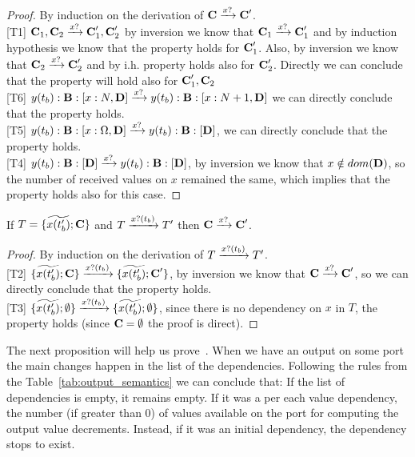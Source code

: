 \begin{proof}{By induction on the derivation of $\textbf{C}\xrightarrow{\text{$x?$}}\textbf{C}'$}.\\


[T1] $\textbf{C}_1,\textbf{C}_2\xrightarrow{\text{$x?$}}\textbf{C}_1',\textbf{C}_2'$ by inversion we know that  $\textbf{C}_1\xrightarrow{\text{$x?$}}\textbf{C}_1'$ and by induction hypothesis we know that the property holds for $\textbf{C}_1'$. Also, by inversion  we know that $\textbf{C}_2\xrightarrow{\text{$x?$}}\textbf{C}_2'$ and by i.h. property holds also for $\textbf{C}_2'$. Directly we can conclude that the property will hold also for $\textbf{C}_1',\textbf{C}_2$\\

[T6] $y(t_b):\textbf{B}:[x:N,\textbf{D}]\xrightarrow{\text{$x?$}} y(t_b):\textbf{B}:[x:N+1,\textbf{D}]$ we can directly conclude that the property holds. \\


[T5] $y(t_b):\textbf{B}:[x:\Omega,\textbf{D}]\xrightarrow{\text{$x?$}} y(t_b):\textbf{B}:[\textbf{D}]$, we can directly conclude that the property holds. \\


[T4] $y(t_b):\textbf{B}:[\textbf{D}]\xrightarrow{\text{$x?$}} y(t_b):\textbf{B}:[\textbf{D}]$, by inversion  we know that $x\notin dom(\textbf{D})$, so the number of received values on $x$ remained the same, which implies that the property holds also for this case.

\end{proof}
 
\begin{lemma} If $T=\{\widetilde{x(t_b')};\textbf{C}\}$ and $T\xrightarrow{\text{$x?(t_b)$}} T'$ then $\textbf{C}\xrightarrow{\text{$x?$}} \textbf{C}'$.

\end{lemma}
 
\begin{proof}{By induction on the derivation of $T \xrightarrow{\text{$x?(t_b)$}} T'$.}\\

[T2] $\{\widetilde{x(t_b')};\textbf{C}\}\xrightarrow{\text{$x?(t_b)$}} \{\widetilde{x(t_b')};\textbf{C}'\}$, by inversion we know that $\textbf{C}\xrightarrow{\text{$x?$}} \textbf{C}'$, so we can directly conclude that the property holds.\\

[T3] $\{\widetilde{x(t_b')};\emptyset \}\xrightarrow{\text{$x?(t_b)$}} \{\widetilde{x(t_b')};\emptyset \}$, since there is no dependency on $x$ in $T$, the property holds (since $\textbf{C}=\emptyset$ the proof is direct).

\end{proof}


The next proposition will help us prove~. When we have an output on some port the main changes happen in the list of the dependencies. Following the rules from the Table~\ref{tab:output_semantics} we can conclude that: If the list of dependencies is empty, it remains empty. If it was a per each value dependency, the number (if greater than 0) of values available on the port for computing the output value decrements. Instead, if it was an initial dependency, the dependency stops to exist.

